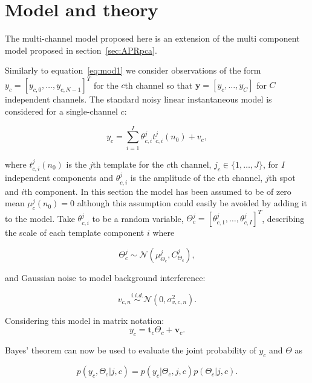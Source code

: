 \section{Model and theory}\label{sec:MultiAPRModelTheory}
The multi-channel model proposed here is an extension of the multi component model proposed in section~\ref{sec:APRpca}.

Similarly to equation~\ref{eq:mod1} we consider observations of the form \linebreak[0]$y_c = [y_{c,0}, \ldots , y_{c,N-1}]^T$ for the $c$th channel so that $\textbf{y} = [y_c, \ldots, y_C]$ for $C$ independent channels. The standard noisy linear instantaneous model is considered for a single-channel $c$:

\begin{equation}\label{eq:mod1_c}
y_c = \sum_{i=1}^{I} \theta_{c,i}^j t_{c,i}^j(n_0) + v_c,
\end{equation}

where $t_{c,i}^j(n_0)$ is the $j$th template for the $c$th channel, $j_c \in \{1, \ldots ,J\}$, for $I$ independent components and $\theta_{c,i}^j$ is the amplitude of the $c$th channel, $j$th spot and $i$th component. In this section the model has been assumed to be of zero mean $\mu_c^j(n_0) =0$ although this assumption could easily be avoided by adding it to the model. Take $\theta_{c,i}^j$ to be a random variable, $\Theta_c^j = [\theta_{c,1}^j,\ldots,\theta_{c,I}^j]^T$, describing the scale of each template component $i$ where

\begin{equation}\label{eq:theta_c}
\Theta_c^j \sim \mathcal{N}(\mu_{\Theta_c}^j,C_{\Theta_c}^j),
\end{equation}

and Gaussian noise to model background interference:

\begin{equation}\label{eq:noise_c}
v_{c,n} \stackrel{i.i.d.}{\sim} \mathcal{N}(0,\sigma_{v,c,n}^2).
\end{equation}

Considering this model in matrix notation:
\begin{equation}\label{eq:mod2}
y_c = \textbf{t}_c\Theta_c + \textbf{v}_c.
\end{equation}

Bayes' theorem can now be used to evaluate the joint probability of $y_c$ and $\Theta$ as

\begin{equation}\label{eq:bayes1_c}
p(y_c,\Theta_c | j, c) = p(y_c|\Theta_c,j,c)p(\Theta_c | j,c).
\end{equation}

